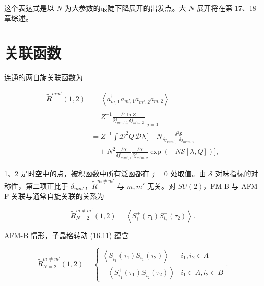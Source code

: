 这个表达式是以 $N$ 为大参数的最陡下降展开的出发点。大 $N$ 展开将在第 17、18 章综述。

\section{关联函数}

连通的两自旋关联函数为

\begin{align*}
\tilde {R} ^ {mm '} ( 1, 2 ) & = \left\langle a _ {m, 1} ^ {\dagger} a _ {m ', 1} a _ {m ', 2} ^ {\dagger} a _ {m, 2} \right\rangle\\
& = Z ^ {- 1} \left. \frac {\delta^ {2} \ln Z}{\delta j_{mm', 1} \, \delta j_{m'm, 2}} \right| _ {j = 0}\\
& = Z ^ {- 1} \int \mathcal {D} ^ {2} Q \, \mathcal {D} \lambda \Big[ - N \frac {\delta^ {2} \mathcal {S}}{\delta j_{mm', 1} \, \delta j_{m'm, 2}}\\
& \quad + N ^ {2} \frac {\delta \mathcal {S}}{\delta j_{mm', 1}} \frac {\delta \mathcal {S}}{\delta j_{m'm, 2}} \exp \left( - N \mathcal {S} [ \lambda, Q ] \right) \Big] ,
\tag{16.40}
\end{align*}

1、2 是时空中的点，被积函数中所有泛函都在 $j=0$ 处取值。由 $\mathcal{S}$ 对味指标的对称性，第二项正比于 $\delta_{mm'}$，$\tilde{R}^{m\neq m'}$ 与 $m,m'$ 无关。对 $SU(2)$，FM-B 与 AFM-F 关联与通常自旋关联的关系为

\begin{equation*}
\tilde {R} _ {N = 2} ^ {m \neq m '} ( 1, 2 ) = \left\langle S _ {i _ {1}} ^ {+} ( \tau_ {1} ) S _ {i _ {2}} ^ {-} ( \tau_ {2} ) \right\rangle .
\tag{16.41}
\end{equation*}

AFM-B 情形，子晶格转动 (16.11) 蕴含

\begin{equation*}
\tilde {R} _ {N = 2} ^ {m \neq m '} ( 1, 2 ) = \left\{ \begin{array}{ll} \left\langle S _ {i _ {1}} ^ {+} ( \tau_ {1} ) S _ {i _ {2}} ^ {-} ( \tau_ {2} ) \right\rangle & i _ {1}, i _ {2} \in A \\ - \left\langle S _ {i _ {1}} ^ {+} ( \tau_ {1} ) S _ {i _ {2}} ^ {+} ( \tau_ {2} ) \right\rangle & i _ {1} \in A, i _ {2} \in B \end{array} \right. .
\tag{16.42}
\end{equation*}


